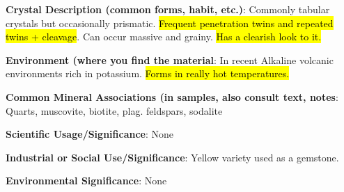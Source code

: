 \documentclass[10pt]{article}
\begin{document}
\begin{framed}
  \textbf{Crystal Description (common forms, habit, etc.)}: Commonly tabular crystals but occasionally prismatic. \hl{Frequent penetration twins and repeated twins + cleavage}. Can occur massive and grainy. \hl{Has a clearish look to it.}
\end{framed}

\begin{framed}
  \textbf{Environment (where you find the material}: In recent Alkaline volcanic environments rich in potassium. \hl{Forms in really hot temperatures.}
\end{framed}

\begin{framed}
  \textbf{Common Mineral Associations (in samples, also consult text, notes}: Quarts, muscovite, biotite, plag. feldspars, sodalite
\end{framed}

\begin{framed}
  \textbf{Scientific Usage/Significance}: None
\end{framed}

\begin{framed}
  \textbf{Industrial or Social Use/Significance}: Yellow variety used as a gemstone.
\end{framed}

\begin{framed}
  \textbf{Environmental Significance}: None
\end{framed}

\end{document}
